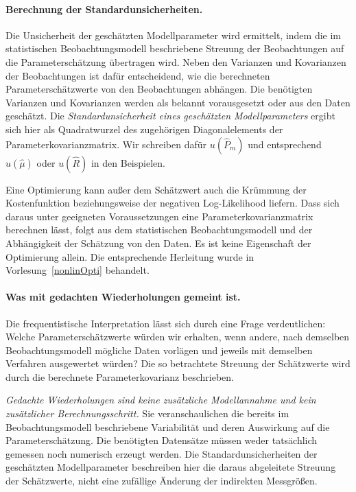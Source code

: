 \paragraph{Berechnung der Standardunsicherheiten.}
Die Unsicherheit der geschätzten Modell\-parameter wird ermittelt,
indem die im statistischen Beobachtungsmodell beschriebene Streuung
der Beobachtungen auf die Parameterschätzung übertragen wird.
Neben den Varianzen und Kovarianzen der Beobachtungen ist dafür
entscheidend, wie die berechneten Parameterschätzwerte von den
Beobachtungen abhängen. Die benötigten Varianzen und Kovarianzen
werden als bekannt vorausgesetzt oder aus den Daten geschätzt.
Die \textsl{Standardunsicherheit eines geschätzten Modellparameters}
ergibt sich hier als Quadratwurzel des zugehörigen Diagonalelements
der Parameterkovarianzmatrix. Wir schreiben dafür $u(\widehat P_m)$
und entsprechend $u(\widehat\mu)$ oder $u(\widehat R)$ in den Beispielen.

Eine Optimierung kann außer dem Schätzwert auch die Krümmung der
Kostenfunktion beziehungsweise der negativen Log-Likelihood liefern.
Dass sich daraus unter geeigneten Voraussetzungen eine
Parameterkovarianzmatrix berechnen lässt, folgt aus dem statistischen
Beobachtungsmodell und der Abhängigkeit der Schätzung von den Daten.
Es ist keine Eigenschaft der Optimierung allein. Die entsprechende
Herleitung wurde in Vorlesung~\ref{nonlinOpti} behandelt.

\paragraph{Was mit gedachten Wiederholungen gemeint ist.}
Die frequentistische Interpretation lässt sich durch eine Frage
verdeutlichen: Welche Parameterschätzwerte würden wir erhalten, wenn
andere, nach demselben Beobachtungsmodell mögliche Daten vorlägen und
jeweils mit demselben Verfahren ausgewertet würden?
Die so betrachtete Streuung der Schätzwerte wird durch die berechnete
Parameterkovarianz beschrieben.

\textsl{Gedachte Wiederholungen sind keine zusätzliche Modellannahme
und kein zusätzlicher Berechnungsschritt.} Sie veranschaulichen die
bereits im Beobachtungsmodell beschriebene Variabilität und deren
Auswirkung auf die Parameterschätzung. Die benötigten Datensätze
müssen weder tatsächlich gemessen noch numerisch erzeugt werden.
Die Standard\-unsicherheiten der geschätzten Modellparameter beschreiben
hier die daraus abgeleitete Streuung der Schätzwerte, nicht eine
zufällige Änderung der indirekten Messgrößen.


